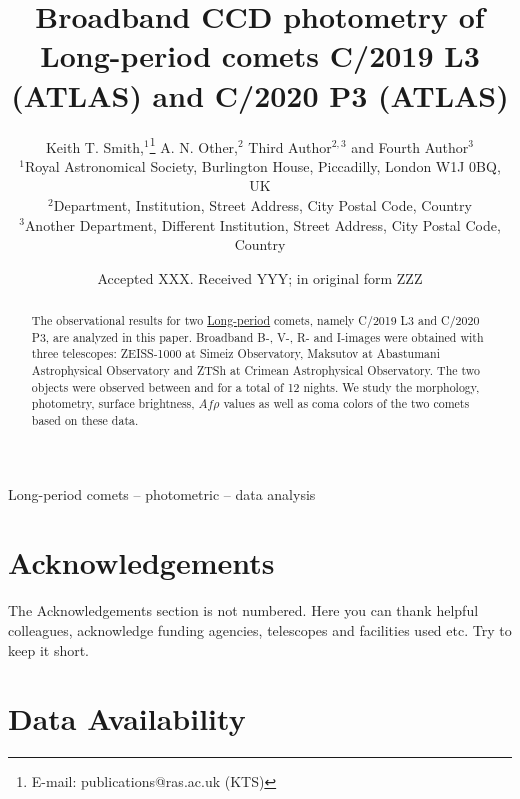 \documentclass[fleqn,usenatbib]{mnras}
\title[Short title, max. 45 characters]{Broadband CCD photometry of Long-period comets C/2019 L3 (ATLAS) and C/2020 P3 (ATLAS)}
\author[K. T. Smith et al.]{
Keith T. Smith,$^{1}$\thanks{E-mail: publications@ras.ac.uk (KTS)}
A. N. Other,$^{2}$
Third Author$^{2,3}$
and Fourth Author$^{3}$
\\
$^{1}$Royal Astronomical Society, Burlington House, Piccadilly, London W1J 0BQ, UK\\
$^{2}$Department, Institution, Street Address, City Postal Code, Country\\
$^{3}$Another Department, Different Institution, Street Address, City Postal Code, Country
}
\date{Accepted XXX. Received YYY; in original form ZZZ}
\begin{document}
\label{firstpage}
\pagerange{\pageref{firstpage}--\pageref{lastpage}}
\maketitle


\begin{abstract}
	The observational results for two \ul{Long-period} comets, namely C/2019 L3 and C/2020 P3, are analyzed in this paper. 
	Broadband B-, V-, R- and I-images were obtained with three telescopes: ZEISS-1000 at Simeiz Observatory, Maksutov at Abastumani Astrophysical Observatory and ZTSh at Crimean Astrophysical Observatory. 
	The two objects were observed between  and  for a total of 12 nights. 
	We study the morphology, photometry, surface brightness, $Af\rho$ values as well as coma colors of the two comets based on these data. 
\end{abstract}

\begin{keywords}
Long-period comets -- photometric -- data analysis
\end{keywords}














\section*{Acknowledgements}

The Acknowledgements section is not numbered. Here you can thank helpful
colleagues, acknowledge funding agencies, telescopes and facilities used etc.
Try to keep it short.

\section*{Data Availability}
\end{document}
